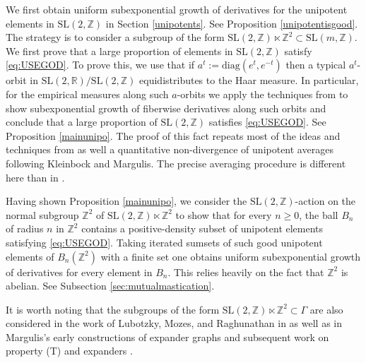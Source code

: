 \documentclass[10pt,reqno]{amsart}
\theoremstyle{Theorem}
\theoremstyle{definition}
\theoremstyle{remark}
\newcommand{\R}{\mathbb {R}}
\newcommand{\Z}{\mathbb {Z}}
\newcommand{\Sl}{\mathrm{SL}}
\def\SL{\Sl}
\begin{document}

We first obtain uniform subexponential growth of derivatives for the unipotent elements in $\Sl(2,\Z)$  in Section \ref{unipotents}.  See Proposition \ref{unipotentisgood}.
The strategy is to consider a subgroup of the form $\Sl(2,\Z)\ltimes \Z^2 \subset \Sl(m,\Z)$. We first prove that a large proportion of    elements in $\Sl(2, \Z)$ satisfy \eqref{eq:USEGOD}. To prove this, we use that if $a^t:= \text{diag}(e^t, e^{-t}) $ %
 then a typical $a^t$-orbit in $\SL(2, \R)/\Sl(2, \Z)$ equidistributes to the Haar measure.  %
 In particular, for the empirical measures along such $a$-orbits we   apply the techniques from \cite{BFH} to show subexponential growth of fiberwise derivatives along such orbits and conclude that a large proportion of $\Sl(2, \Z)$ satisfies \eqref{eq:USEGOD}.   See Proposition \ref{mainunipo}. The proof of this fact repeats most of the ideas and techniques from \cite{BFH} as well a quantitative non-divergence of unipotent averages following  Kleinbock and Margulis. %
The precise averaging procedure is different here than in \cite{BFH}.

Having shown Proposition \ref{mainunipo}, we consider the $\Sl(2,\Z)$-action on the normal  subgroup $\Z^2$ of $\Sl(2,\Z)\ltimes \Z^2$  to show that   for every $n \geq 0$, the ball $B_n$ of radius $n$ in $\Z^2$ contains a positive-density subset  of unipotent elements satisfying \eqref{eq:USEGOD}.  Taking iterated sumsets of such good unipotent elements of $B_n(\Z^2)$  with   a finite set  one obtains uniform subexponential growth of derivatives for every element in $B_n$. This relies heavily on the fact that $\Z^2$ is abelian. See Subsection \ref{sec:mutualmastication}.


It is worth noting that the subgroups of the form $\Sl(2,\Z)\ltimes \Z^2\subset \Gamma$ are also considered in the work of Lubotzky, Mozes, and Raghunathan in \cite{MR1244421} as well as in Margulis's early constructions of expander graphs and   subsequent work on property (T) and expanders \cite{MR0484767}. %
\end{document}
